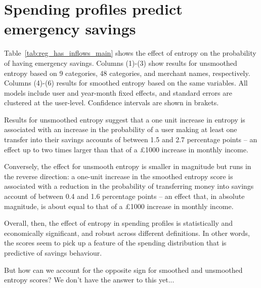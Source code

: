 
\section{Spending profiles predict emergency savings}%
\label{sec:results}

Table~\ref{tab:reg_has_inflows_main} shows the effect of entropy on the
probability of having emergency savings. Columns (1)-(3) show results for
unsmoothed entropy based on 9 categories, 48 categories, and merchant names,
respectively. Columns (4)-(6) results for smoothed entropy based on the same
variables. All models include user and year-month fixed effects, and standard
errors are clustered at the user-level. Confidence intervals are shown in
brakets.



Results for unsmoothed entropy suggest that a one unit increase in entropy is
associated with an increase in the probability of a user making at least one
transfer into their savings accounts of between 1.5 and 2.7 percentage points
-- an effect up to two times larger than that of a \pounds1000 increase in
monthly income.

Conversely, the effect for unsmooth entropy is smaller in magnitude but runs in
the reverse direction: a one-unit increase in the smoothed entropy score is
associated with a reduction in the probability of transferring money into
savings account of between 0.4 and 1.6 percentage points -- an effect that, in
absolute magnitude, is about equal to that of a \pounds1000 increase in monthly
income.

Overall, then, the effect of entropy in spending profiles is statistically and
economically significant, and robust across different definitions. In other
words, the scores seem to pick up a feature of the spending distribution that
is predictive of savings behaviour.

But how can we account for the opposite sign for smoothed and unsmoothed
entropy scores? We don't have the answer to this yet... 




